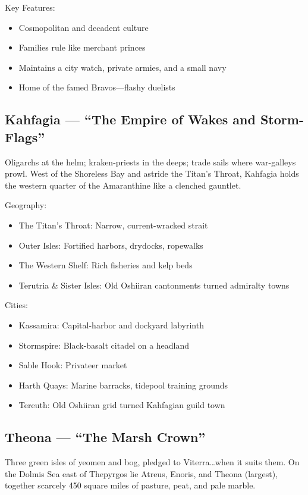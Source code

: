 Key Features:
\begin{itemize}
    \item Cosmopolitan and decadent culture
    \item Families rule like merchant princes
    \item Maintains a city watch, private armies, and a small navy
    \item Home of the famed Bravos---flashy duelists
\end{itemize}

\subsection{Kahfagia --- ``The Empire of Wakes and Storm-Flags''}
\label{sec:kahfagia}

Oligarchs at the helm; kraken-priests in the deeps; trade sails where war-galleys prowl. West of the Shoreless Bay and astride the Titan's Throat, Kahfagia holds the western quarter of the Amaranthine like a clenched gauntlet.

Geography:
\begin{itemize}
    \item The Titan's Throat: Narrow, current-wracked strait
    \item Outer Isles: Fortified harbors, drydocks, ropewalks
    \item The Western Shelf: Rich fisheries and kelp beds
    \item Terutria \& Sister Isles: Old Oshiiran cantonments turned admiralty towns
\end{itemize}

Cities:
\begin{itemize}
    \item Kassamira: Capital-harbor and dockyard labyrinth
    \item Stormspire: Black-basalt citadel on a headland
    \item Sable Hook: Privateer market
    \item Harth Quays: Marine barracks, tidepool training grounds
    \item Tereuth: Old Oshiiran grid turned Kahfagian guild town
\end{itemize}

\subsection{Theona --- ``The Marsh Crown''}
\label{sec:theona}

Three green isles of yeomen and bog, pledged to Viterra\dots when it suits them. On the Dolmis Sea east of Thepyrgos lie Atreus, Enoris, and Theona (largest), together scarcely 450 square miles of pasture, peat, and pale marble.

